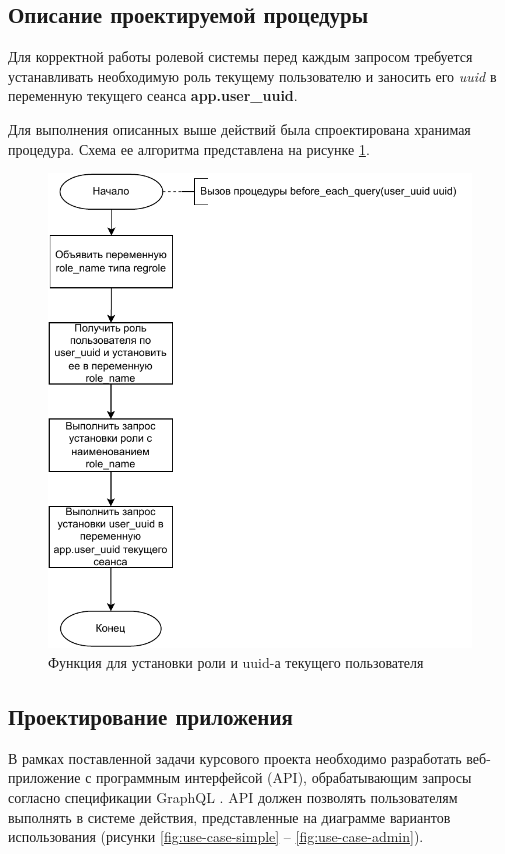 \subsection{Описание проектируемой процедуры}
Для корректной работы ролевой системы перед каждым запросом требуется устанавливать необходимую роль текущему пользователю и заносить его \textit{uuid} в переменную текущего сеанса \textbf{app.user\_uuid}. 

Для выполнения описанных выше действий была спроектирована хранимая процедура. Схема ее алгоритма представлена на рисунке \ref{fig:DB-func}.

\begin{figure}[ht!]
	\centering
	\includegraphics[width=0.9\linewidth]{assets/images/Func.pdf}
	\caption{Функция для установки роли и uuid-а текущего пользователя}
	\label{fig:DB-func}
\end{figure}

\subsection{Проектирование приложения}

В рамках поставленной задачи курсового проекта необходимо разработать веб-приложение с программным интерфейсой (API), обрабатывающим запросы согласно спецификации GraphQL \cite{graphql-spec}. API должен позволять пользователям выполнять в системе действия, представленные на диаграмме вариантов использования (рисунки \ref{fig:use-case-simple} -- \ref{fig:use-case-admin}).

